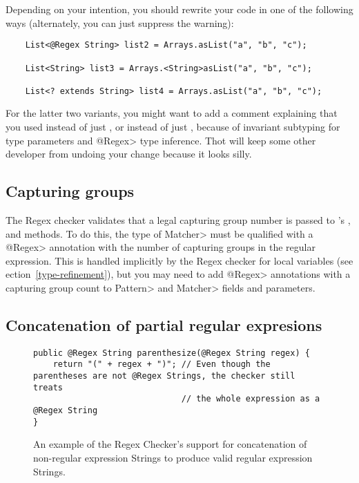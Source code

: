 Depending on your intention, you should rewrite your code in one of the
following ways (alternately, you can just suppress the warning):

\begin{Verbatim}
    List<@Regex String> list2 = Arrays.asList("a", "b", "c");

    List<String> list3 = Arrays.<String>asList("a", "b", "c");

    List<? extends String> list4 = Arrays.asList("a", "b", "c");
\end{Verbatim}

\noindent
For the latter two variants, you might want to add a comment explaining
that you used  instead of just , or
 instead of just , because
of invariant subtyping for type parameters and \<@Regex> type inference.
Thot will keep some other developer from undoing your change because it
looks silly.


\subsection{Capturing groups\label{regex-capturing-groups}}

The Regex checker validates that a legal capturing group number is passed
to 's
,
 and
 methods. To do this,
the type of \<Matcher> must be qualified with a \<@Regex> annotation
with the number of capturing groups in the regular expression. This is
handled implicitly by the Regex checker for local variables (see
ection~\ref{type-refinement}), but you may need to add \<@Regex> annotations
with a capturing group count to \<Pattern> and \<Matcher> fields and
parameters.


\subsection{Concatenation of partial regular expresions\label{regex-partial-regex}}

\begin{figure}
\begin{Verbatim}
public @Regex String parenthesize(@Regex String regex) {
    return "(" + regex + ")"; // Even though the parentheses are not @Regex Strings, the checker still treats
                              // the whole expression as a @Regex String
}
\end{Verbatim}
\caption{An example of the Regex Checker's support for concatenation
of non-regular expression Strings to produce valid regular expression Strings.}
\label{fig:regex-partial}
\end{figure}

